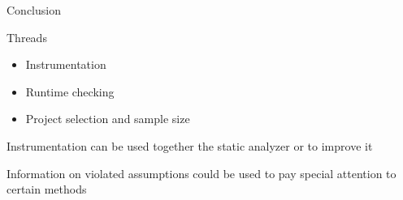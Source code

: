 \begin{frame}{Conclusion}

\vspace*{-0.6cm}

Threads
\vspace*{0.2cm}
\begin{itemize}
  \item Instrumentation
  \vspace*{0.3cm}
  \item Runtime checking
  \vspace*{0.3cm}
  \item Project selection and sample size
\end{itemize}

\vspace*{0.8cm}

Instrumentation can be used together the static analyzer or to improve it

\vspace*{0.4cm}

Information on violated assumptions could be used to pay special attention to
certain methods

\end{frame}